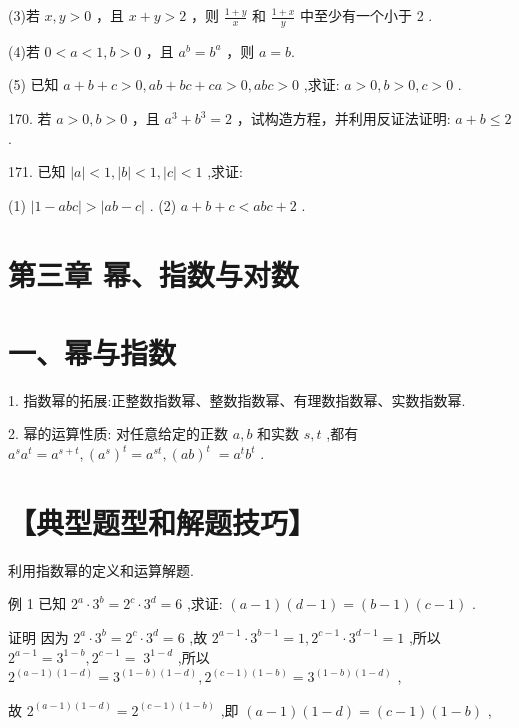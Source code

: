 \documentclass[10pt]{article}
\begin{document}
(3)若 \(x,y > 0\) ，且 \(x + y > 2\) ，则 \(\frac{1 + y}{x}\) 和 \(\frac{1 + x}{y}\) 中至少有一个小于 2 .

(4)若 \(0 < a < 1,b > 0\) ，且 \({a}^{b} = {b}^{a}\) ，则 \(a = b.\)

(5) 已知 \(a + b + c > 0,{ab} + {bc} + {ca} > 0,{abc} > 0\) ,求证: \(a > 0,b > 0,c > 0\) .

170. 若 \(a > 0,b > 0\) ，且 \({a}^{3} + {b}^{3} = 2\) ，试构造方程，并利用反证法证明: \(a + b \leq  2\) .

171. 已知 \(\left| a\right|  < 1,\left| b\right|  < 1,\left| c\right|  < 1\) ,求证:

(1) \(\left| {1 - {abc}}\right|  > \left| {{ab} - c}\right|\) . (2) \(a + b + c < {abc} + 2\) .

\section*{第三章 幂、指数与对数}

\section*{一、幂与指数}

1. 指数幂的拓展:正整数指数幂、整数指数幂、有理数指数幂、实数指数幂.

2. 幂的运算性质: 对任意给定的正数 \(a,b\) 和实数 \(s,t\) ,都有 \({a}^{s}{a}^{t} = {a}^{s + t},{\left( {a}^{s}\right) }^{t} = {a}^{st},{\left( ab\right) }^{t} \; = {a}^{t}{b}^{t}\) .

\section*{【典型题型和解题技巧】}

利用指数幂的定义和运算解题.

例 1 已知 \({2}^{a} \cdot  {3}^{b} = {2}^{c} \cdot  {3}^{d} = 6\) ,求证: \(\left( {a - 1}\right) \left( {d - 1}\right)  = \left( {b - 1}\right) \left( {c - 1}\right)\) .

证明 因为 \({2}^{a} \cdot  {3}^{b} = {2}^{c} \cdot  {3}^{d} = 6\) ,故 \({2}^{a - 1} \cdot  {3}^{b - 1} = 1,{2}^{c - 1} \cdot  {3}^{d - 1} = 1\) ,所以 \({2}^{a - 1} = {3}^{1 - b},{2}^{c - 1} = \; {3}^{1 - d}\) ,所以 \({2}^{\left( {a - 1}\right) \left( {1 - d}\right) } = {3}^{\left( {1 - b}\right) \left( {1 - d}\right) },{2}^{\left( {c - 1}\right) \left( {1 - b}\right) } = {3}^{\left( {1 - b}\right) \left( {1 - d}\right) }\) ,

故 \({2}^{\left( {a - 1}\right) \left( {1 - d}\right) } = {2}^{\left( {c - 1}\right) \left( {1 - b}\right) }\) ,即 \(\left( {a - 1}\right) \left( {1 - d}\right)  = \left( {c - 1}\right) \left( {1 - b}\right)\) ,
\end{document}
